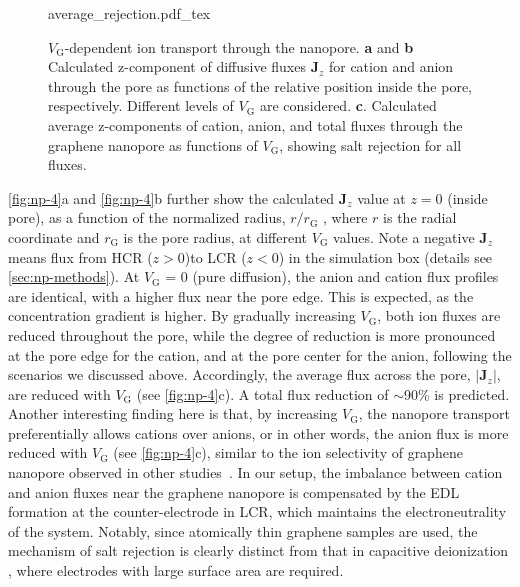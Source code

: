 \begin{figure}[!htbp]
  \centering
   {average_rejection.pdf_tex}
   \caption{ $V_{\mathrm{G}}$-dependent ion transport through the
       nanopore.  \textbf{a} and \textbf{b} Calculated z-component of
       diffusive fluxes $\symbf{J}_{z}$ for cation and anion through
       the pore as functions of the relative position inside the pore,
       respectively.  Different levels of $V_{\mathrm{G}}$ are
       considered. \textbf{c}. Calculated average z-components of
       cation, anion, and total fluxes through the graphene nanopore
       as functions of $V_{\mathrm{G}}$, showing salt rejection for
       all fluxes.}
  \label{fig:np-4}
\end{figure}
%
\autoref{fig:np-4}a and \autoref{fig:np-4}b further show the calculated $\symbf{J}_{z}$ value
at $z=0$ (inside pore), as a function of the normalized radius, $r/r_{\mathrm{G}}$ ,
where $r$ is the radial coordinate and $r_{\mathrm{G}}$ is the pore
radius, at different $V_{\mathrm{G}}$ values. Note a negative
$\symbf{J}_{z}$ means flux from HCR ($z>0$)to LCR ($z<0$) in the
simulation box (details see \autoref{sec:np-methods}).
%
At $V_{\mathrm{G}}$ = 0 (pure
diffusion), the anion and cation flux profiles are identical, with a
higher flux near the pore edge.
This is expected, as the
concentration gradient is higher.
%
By gradually increasing $V_{\mathrm{G}}$, both ion fluxes are reduced
throughout the pore, while the degree of reduction is more pronounced
at the pore edge for the cation, and at the pore center for the anion,
following the scenarios we discussed above. Accordingly, the average
flux across the pore, $|\symbf{J}_{z}|$, are reduced with
$V_{\mathrm{G}}$ (see \autoref{fig:np-4}c). A total flux reduction of
$\sim$90\% is predicted. Another interesting finding here is that, by
increasing $V_{\mathrm{G}}$, the nanopore transport preferentially
allows cations over anions, or in other words, the anion flux is more
reduced with $V_{\mathrm{G}}$ (see \autoref{fig:np-4}c), similar to
the ion selectivity of graphene nanopore observed in other
studies~\autocite{Rollings_2016_gating}.
%
In our
setup, the imbalance between cation and anion fluxes near the graphene
nanopore is compensated by the EDL formation at the counter-electrode
in LCR, which maintains the electroneutrality of the system. Notably,
since atomically thin graphene samples are used, the mechanism of salt
rejection is clearly distinct from that in capacitive deionization
\autocite{Biesheuvel_2010_desalin_theory}, where electrodes with large
surface area are required.


